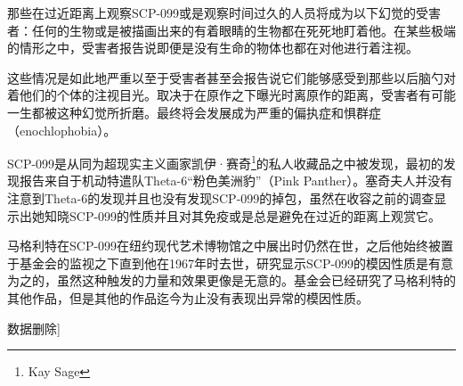 那些在过近距离上观察SCP-099或是观察时间过久的人员将成为以下幻觉的受害者：任何的生物或是被描画出来的有着眼睛的生物都在死死地盯着他。在某些极端的情形之中，受害者报告说即便是没有生命的物体也都在对他进行着注视。

这些情况是如此地严重以至于受害者甚至会报告说它们能够感受到那些以后脑勺对着他们的个体的注视目光。取决于在原作之下曝光时离原作的距离，受害者有可能一生都被这种幻觉所折磨。最终将会发展成为严重的偏执症和惧群症（enochlophobia）。

SCP-099是从同为超现实主义画家凯伊·赛奇\footnote{ Kay Sage}的私人收藏品之中被发现，最初的发现报告来自于机动特遣队Theta-6“粉色美洲豹”（Pink Panther）。塞奇夫人并没有注意到Theta-6的发现并且也没有发现SCP-099的掉包，虽然在收容之前的调查显示出她知晓SCP-099的性质并且对其免疫或是总是避免在过近的距离上观赏它。

马格利特在SCP-099在纽约现代艺术博物馆之中展出时仍然在世，之后他始终被置于基金会的监视之下直到他在1967年时去世，研究显示SCP-099的模因性质是有意为之的，虽然这种触发的力量和效果更像是无意的。基金会已经研究了马格利特的其他作品，但是其他的作品迄今为止没有表现出异常的模因性质。

\bb{武器化申请：}{[}数据删除]
